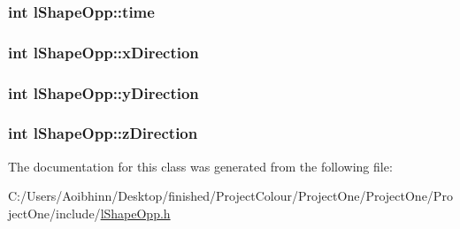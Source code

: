 \hypertarget{classl_shape_opp_aef174fd2adc27dd52c3dacd62be802ab}{
\subsubsection[{time}]{\setlength{\rightskip}{0pt plus 5cm}int l\-Shape\-Opp\-::time}}\label{classl_shape_opp_aef174fd2adc27dd52c3dacd62be802ab}
\hypertarget{classl_shape_opp_a101294c9ea1dc2f1a37fb95a87426702}{
\subsubsection[{x\-Direction}]{\setlength{\rightskip}{0pt plus 5cm}int l\-Shape\-Opp\-::x\-Direction}}\label{classl_shape_opp_a101294c9ea1dc2f1a37fb95a87426702}
\hypertarget{classl_shape_opp_a0340df57978d442190a30927a919f34e}{
\subsubsection[{y\-Direction}]{\setlength{\rightskip}{0pt plus 5cm}int l\-Shape\-Opp\-::y\-Direction}}\label{classl_shape_opp_a0340df57978d442190a30927a919f34e}
\hypertarget{classl_shape_opp_a5ca5f7c8b6b0faf17d04bc2212966c3e}{
\subsubsection[{z\-Direction}]{\setlength{\rightskip}{0pt plus 5cm}int l\-Shape\-Opp\-::z\-Direction}}\label{classl_shape_opp_a5ca5f7c8b6b0faf17d04bc2212966c3e}


The documentation for this class was generated from the following file\-:\begin{DoxyCompactItemize}
\item 
C\-:/\-Users/\-Aoibhinn/\-Desktop/finished/\-Project\-Colour/\-Project\-One/\-Project\-One/\-Project\-One/include/\hyperlink{l_shape_opp_8h}{l\-Shape\-Opp.\-h}\end{DoxyCompactItemize}
